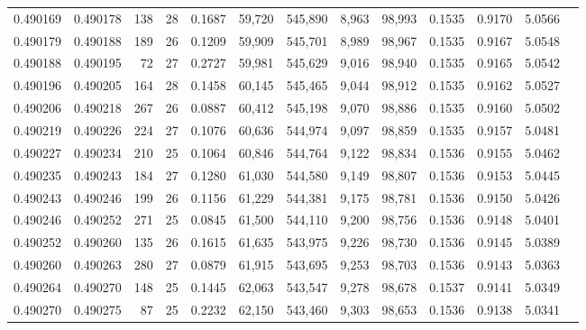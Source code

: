 \begin{tabular}{rrrrrrrrrrrrr}
0.490169 & 0.490178 & 138 &  28 &                                     0.1687 &  59,720 & 545,890 &   8,963 &  98,993 & 0.1535 & 0.9170 & 5.0566 \\
0.490179 & 0.490188 & 189 &  26 &                                     0.1209 &  59,909 & 545,701 &   8,989 &  98,967 & 0.1535 & 0.9167 & 5.0548 \\
0.490188 & 0.490195 &  72 &  27 &                                     0.2727 &  59,981 & 545,629 &   9,016 &  98,940 & 0.1535 & 0.9165 & 5.0542 \\
0.490196 & 0.490205 & 164 &  28 &                                     0.1458 &  60,145 & 545,465 &   9,044 &  98,912 & 0.1535 & 0.9162 & 5.0527 \\
0.490206 & 0.490218 & 267 &  26 &                                     0.0887 &  60,412 & 545,198 &   9,070 &  98,886 & 0.1535 & 0.9160 & 5.0502 \\
0.490219 & 0.490226 & 224 &  27 &                                     0.1076 &  60,636 & 544,974 &   9,097 &  98,859 & 0.1535 & 0.9157 & 5.0481 \\
0.490227 & 0.490234 & 210 &  25 &                                     0.1064 &  60,846 & 544,764 &   9,122 &  98,834 & 0.1536 & 0.9155 & 5.0462 \\
0.490235 & 0.490243 & 184 &  27 &                                     0.1280 &  61,030 & 544,580 &   9,149 &  98,807 & 0.1536 & 0.9153 & 5.0445 \\
0.490243 & 0.490246 & 199 &  26 &                                     0.1156 &  61,229 & 544,381 &   9,175 &  98,781 & 0.1536 & 0.9150 & 5.0426 \\
0.490246 & 0.490252 & 271 &  25 &                                     0.0845 &  61,500 & 544,110 &   9,200 &  98,756 & 0.1536 & 0.9148 & 5.0401 \\
0.490252 & 0.490260 & 135 &  26 &                                     0.1615 &  61,635 & 543,975 &   9,226 &  98,730 & 0.1536 & 0.9145 & 5.0389 \\
0.490260 & 0.490263 & 280 &  27 &                                     0.0879 &  61,915 & 543,695 &   9,253 &  98,703 & 0.1536 & 0.9143 & 5.0363 \\
0.490264 & 0.490270 & 148 &  25 &                                     0.1445 &  62,063 & 543,547 &   9,278 &  98,678 & 0.1537 & 0.9141 & 5.0349 \\
0.490270 & 0.490275 &  87 &  25 &                                     0.2232 &  62,150 & 543,460 &   9,303 &  98,653 & 0.1536 & 0.9138 & 5.0341 \\

\end{tabular}
